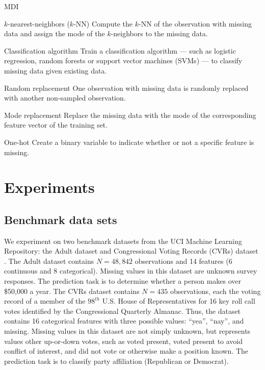 \documentclass[10pt,twocolumn,letterpaper]{article}
\begin{document}
\begin{labeling}{MDI}

\item[$k$-nearest-neighbors ($k$-NN)]
Compute the $k$-NN of the observation with missing data and assign the mode of the $k$-neighbors to the missing data.

\item[Classification algorithm]
Train a classification algorithm --- such as logistic regression, random forests or support vector machines (SVMs) --- to classify missing data given existing data. 


\item[Random replacement] 
One observation with missing data is randomly replaced with another non-sampled observation.

\item[Mode replacement]
Replace the missing data with the mode of the corresponding feature vector of the training set.

\item[One-hot] Create a binary variable to indicate whether or not a specific feature is missing.

\end{labeling}

\section{Experiments} \label{section:experiments}

\subsection{Benchmark data sets}

We experiment on two benchmark datasets from the UCI Machine Learning Repository: the Adult dataset and Congressional Voting Records (CVRs) dataset \cite{Lichman2013}. The Adult dataset contains $N=48,842$ observations and 14 features (6 continuous and 8 categorical). Missing values in this dataset are unknown survey responses. The prediction task is to determine whether a person makes over \$50,000 a year. The CVRs dataset contains $N=435$ observations, each the voting record of a member of the $98^{th}$ U.S. House of Representatives for 16 key roll call votes identified by the Congressional Quarterly Almanac. Thus, the dataset contains 16 categorical features with three possible values: ``yea'', ``nay'', and missing. Missing values in this dataset are not simply unknown, but represents values other up-or-down votes, such as voted present, voted present to avoid conflict of interest, and did not vote or otherwise make a position known. The prediction task is to classify party affiliation (Republican or Democrat). 
\end{document}
